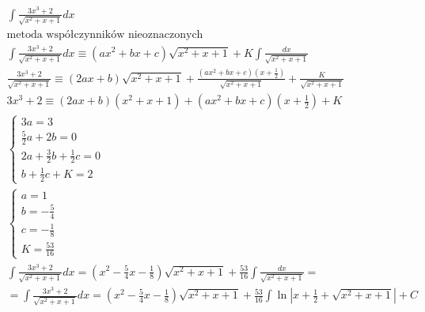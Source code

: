\begin{gather*}
  \int \frac{3x^3+2}{\sqrt{x^2+x+1}}dx \\
  \text{metoda współczynników nieoznaczonych} \\
  \int \frac{3x^3+2}{\sqrt{x^2+x+1}}dx \equiv (ax^2+bx+c)\sqrt{x^2+x+1}+K\int \frac{dx}{\sqrt{x^2+x+1}} \\
  \frac{3x^3+2}{\sqrt{x^2+x+1}} \equiv (2ax+b)\sqrt{x^2+x+1} + \frac{(ax^2+bx+c)(x+\frac{1}{2})}{\sqrt{x^2+x+1}} + \frac{K}{\sqrt{x^2+x+1}} \\
  3x^3+2 \equiv (2ax+b)(x^2+x+1)+(ax^2+bx+c)(x+\frac{1}{2})+K \\
  \begin{cases} 3a=3 \\ \frac{5}{2}a+2b=0 \\ 2a+\frac{3}{2}b+\frac{1}{2}c=0 \\ b+\frac{1}{2}c+K=2 \end{cases} \\
  \begin{cases} a=1 \\ b=-\frac{5}{4} \\ c=-\frac{1}{8} \\ K=\frac{53}{16} \end{cases} \\
  \int \frac{3x^3+2}{\sqrt{x^2+x+1}}dx
  = (x^2-\frac{5}{4}x-\frac{1}{8})\sqrt{x^2+x+1}+\frac{53}{16}\int \frac{dx}{\sqrt{x^2+x+1}} = \\
  = \int \frac{3x^3+2}{\sqrt{x^2+x+1}}dx
  = (x^2-\frac{5}{4}x-\frac{1}{8})\sqrt{x^2+x+1}+\frac{53}{16}\int \ln|x+\frac{1}{2}+\sqrt{x^2+x+1}|+C
\end{gather*}



